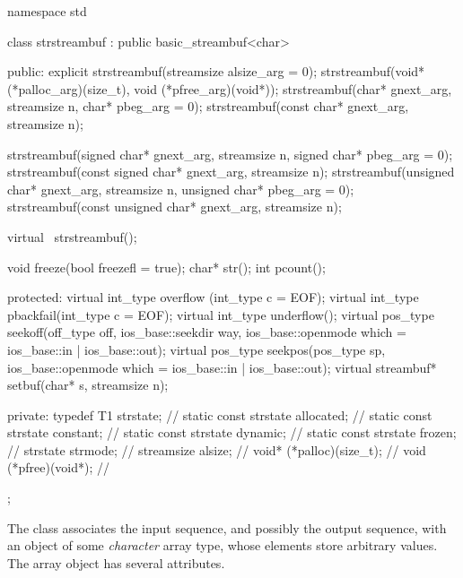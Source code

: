 %
\begin{codeblock}
namespace std {
  class strstreambuf : public basic_streambuf<char> {
  public:
    explicit strstreambuf(streamsize alsize_arg = 0);
    strstreambuf(void* (*palloc_arg)(size_t), void (*pfree_arg)(void*));
    strstreambuf(char* gnext_arg, streamsize n, char* pbeg_arg = 0);
    strstreambuf(const char* gnext_arg, streamsize n);

    strstreambuf(signed char* gnext_arg, streamsize n,
                 signed char* pbeg_arg = 0);
    strstreambuf(const signed char* gnext_arg, streamsize n);
    strstreambuf(unsigned char* gnext_arg, streamsize n,
                 unsigned char* pbeg_arg = 0);
    strstreambuf(const unsigned char* gnext_arg, streamsize n);

    virtual ~strstreambuf();

    void  freeze(bool freezefl = true);
    char* str();
    int   pcount();

  protected:
    virtual int_type overflow (int_type c = EOF);
    virtual int_type pbackfail(int_type c = EOF);
    virtual int_type underflow();
    virtual pos_type seekoff(off_type off, ios_base::seekdir way,
                             ios_base::openmode which
                               = ios_base::in | ios_base::out);
    virtual pos_type seekpos(pos_type sp, ios_base::openmode which
                               = ios_base::in | ios_base::out);
    virtual streambuf* setbuf(char* s, streamsize n);

  private:
    typedef T1 strstate;              // \exposr
    static const strstate allocated;  //  \exposr
    static const strstate constant;   // \exposr
    static const strstate dynamic;    // \exposr
    static const strstate frozen;     // \exposr
    strstate strmode;                 // \exposr
    streamsize alsize;                // \exposr
    void* (*palloc)(size_t);          // \exposr
    void (*pfree)(void*);             // \exposr
  };
}
\end{codeblock}

\pnum
The class
associates the input sequence, and possibly the output sequence, with an object of some
\textit{character}
array type, whose elements store arbitrary values.
The array object has several attributes.

